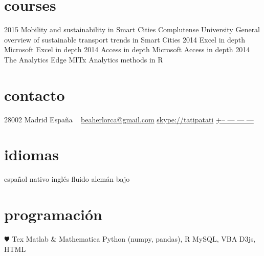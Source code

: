 \documentclass[]{friggeri-cv}
\begin{document}
\section{courses}

\begin{entrylist}
  \entry
    {2015}
    {Mobility and sustainability in Smart Cities}
    {Complutense University}
    {General overview of sustainable transport trends in Smart Cities}
  \entry
    {2014}
    {Excel in depth}
    {}
    {Microsoft Excel in depth}
  \entry
    {2014}
    {Access in depth}
    {}
    {Microsoft Access in depth}
  \entry
    {2014}
    {The Analytics Edge}
    {MITx}
    {Analytics methods in R}
\end{entrylist}




\else 

       {}


\begin{aside}
  \section{contacto}
    28002 Madrid
    España
    ~
    \href{mailto:beaherlorca@gmail.com}{beaherlorca@gmail.com}
    \href{skype:<tatipatati>[add]}{skype://tatipatati}
    \href{tel:xxxxxxxxxxx}{+-- --- --- ---}
  \section{idiomas}
    español nativo
    inglés fluido
    alemán bajo
  \section{programación}
    {\color{red} $\varheartsuit$} Tex
    Matlab \& Mathematica
    Python (numpy, pandas), R
    MySQL, VBA
    D3js, HTML
\end{aside}
\end{document}
